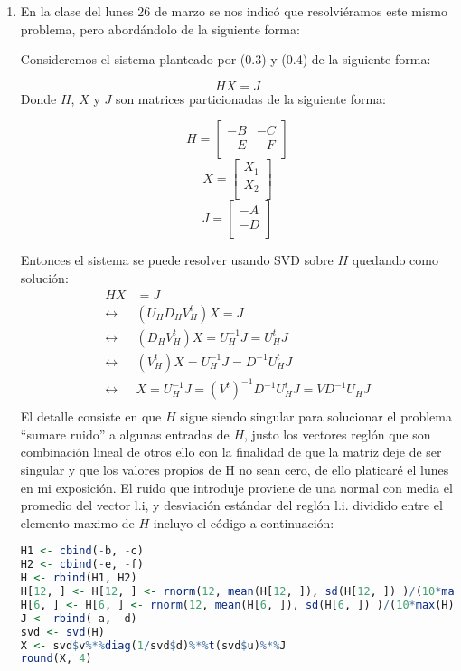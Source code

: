 \documentclass[paper=letter, fontsize=11pt]{scrartcl}
\numberwithin{equation}{section} %
\numberwithin{figure}{section} %
\numberwithin{table}{section} %
\begin{document}
\begin{enumerate}
\begin{enumerate}
\item En la clase del lunes 26 de marzo se nos indicó que resolviéramos este mismo problema, pero abordándolo de la siguiente forma:

Consideremos el sistema planteado por (0.3) y (0.4) de la siguiente forma:

\[ HX = J \]
Donde $H$, $X$ y $J$ son matrices particionadas de la siguiente forma:

 
\[ H = 
\begin{bmatrix}
-B & -C \\
-E & -F\\
\end{bmatrix}
\]
\[ X = 
\begin{bmatrix}
X_1 \\
X_2\\
\end{bmatrix}
\]
\[ J = 
\begin{bmatrix}
-A \\
-D\\
\end{bmatrix}
\]

Entonces el sistema se puede resolver usando SVD sobre $H$ quedando como solución:
\[
\begin{split}
HX & = J\\
\leftrightarrow & (U_HD_HV^t_H)X = J\\
\leftrightarrow & (D_HV^t_H)X = U_H^{-1}J=U_H^tJ\\
\leftrightarrow & (V^t_H)X = U_H^{-1}J=D^{-1}U_H^tJ\\
\leftrightarrow & X = U_H^{-1}J=(V^t)^{-1}D^{-1}U_H^tJ=VD^{-1}U_HJ\\
\end{split}
\]
El detalle consiste en que $H$ sigue siendo singular para solucionar el problema “sumare ruido” a algunas entradas de $H$, justo los vectores reglón que son combinación lineal de otros ello con la finalidad de que la matriz deje de ser singular y que los valores propios de H no sean cero, de ello platicaré el lunes en mi exposición. El ruido que introduje proviene de una normal con media el promedio del vector l.i, y desviación estándar del reglón l.i. dividido entre el elemento maximo de $H$ incluyo el código a continuación:
\begin{lstlisting}[style=customc,basicstyle=\scriptsize, language=R]
H1 <- cbind(-b, -c)
H2 <- cbind(-e, -f)
H <- rbind(H1, H2)
H[12, ] <- H[12, ] <- rnorm(12, mean(H[12, ]), sd(H[12, ]) )/(10*max(H))
H[6, ] <- H[6, ] <- rnorm(12, mean(H[6, ]), sd(H[6, ]) )/(10*max(H))
J <- rbind(-a, -d)
svd <- svd(H)
X <- svd$v%*%diag(1/svd$d)%*%t(svd$u)%*%J
round(X, 4)
\end{lstlisting}


\end{enumerate}
\end{enumerate}
\end{document}
